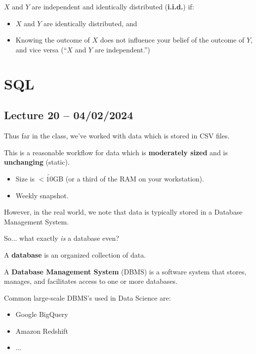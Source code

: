 \documentclass[openany]{book}
\begin{document}
\begin{defn}[i.i.d]
	$X$ and $Y$ are independent and identically distributed (\textbf{i.i.d.}) if:
	\begin{itemize}
		\item $X$ and $Y$ are identically distributed, and
		\item Knowing the outcome of $X$ does not influence your belief of the outcome of $Y$, and vice versa (“$X$ and $Y$ are independent.”)
	\end{itemize}
\end{defn}

\chapter{SQL}
\section{Lecture 20 -- 04/02/2024}
Thus far in the class, we've worked with data which is stored in CSV files.

This is a reasonable workflow for data which is \textbf{moderately sized} and is \textbf{unchanging} (static).
\begin{itemize}
	\item Size is $<\tilde{10}$GB (or a third of the RAM on your workstation).
	\item Weekly snapshot.
\end{itemize}

However, in the real world, we note that data is typically stored in a Database Management System.

So... what exactly \textit{is} a database even?
\begin{defn}[Database]
	A \textbf{database} is an organized collection of data.
\end{defn}

\begin{defn}
	A \textbf{Database Management System} (DBMS) is a software system that stores, manages, and facilitates access to one or more databases.
\end{defn}
\begin{example}
	Common large-scale DBMS's used in Data Science are:
	\begin{itemize}
		\item Google BigQuery
		\item Amazon Redshift
		\item ...
	\end{itemize}
\end{example}
\end{document}
